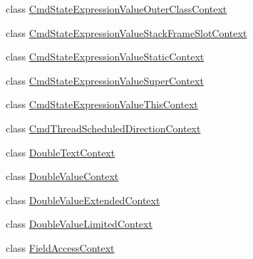 \begin{DoxyCompactItemize}
\item 
class \hyperlink{classgov_1_1nasa_1_1jpf_1_1inspector_1_1server_1_1expression_1_1parser_1_1_expression_grammar_paa97aac802c11881ff9166c765f4fc61a}{Cmd\+State\+Expression\+Value\+Outer\+Class\+Context}
\item 
class \hyperlink{classgov_1_1nasa_1_1jpf_1_1inspector_1_1server_1_1expression_1_1parser_1_1_expression_grammar_pa53e28d24e840d016fb7c58b2b73008ab}{Cmd\+State\+Expression\+Value\+Stack\+Frame\+Slot\+Context}
\item 
class \hyperlink{classgov_1_1nasa_1_1jpf_1_1inspector_1_1server_1_1expression_1_1parser_1_1_expression_grammar_pa08e6165e66cacb4d3382a343315ee767}{Cmd\+State\+Expression\+Value\+Static\+Context}
\item 
class \hyperlink{classgov_1_1nasa_1_1jpf_1_1inspector_1_1server_1_1expression_1_1parser_1_1_expression_grammar_pa66c003646cac4c60d53e10c6587465ef}{Cmd\+State\+Expression\+Value\+Super\+Context}
\item 
class \hyperlink{classgov_1_1nasa_1_1jpf_1_1inspector_1_1server_1_1expression_1_1parser_1_1_expression_grammar_pa5c670e8752735864512a29116a6ade67}{Cmd\+State\+Expression\+Value\+This\+Context}
\item 
class \hyperlink{classgov_1_1nasa_1_1jpf_1_1inspector_1_1server_1_1expression_1_1parser_1_1_expression_grammar_pa3ae49d5d83c380526042a5aff91ee0a2}{Cmd\+Thread\+Scheduled\+Direction\+Context}
\item 
class \hyperlink{classgov_1_1nasa_1_1jpf_1_1inspector_1_1server_1_1expression_1_1parser_1_1_expression_grammar_parser_1_1_double_text_context}{Double\+Text\+Context}
\item 
class \hyperlink{classgov_1_1nasa_1_1jpf_1_1inspector_1_1server_1_1expression_1_1parser_1_1_expression_grammar_parser_1_1_double_value_context}{Double\+Value\+Context}
\item 
class \hyperlink{classgov_1_1nasa_1_1jpf_1_1inspector_1_1server_1_1expression_1_1parser_1_1_expression_grammar_paf529e59fbe08e921d008fd67634bb19c}{Double\+Value\+Extended\+Context}
\item 
class \hyperlink{classgov_1_1nasa_1_1jpf_1_1inspector_1_1server_1_1expression_1_1parser_1_1_expression_grammar_pa747378014be7c4ab66961e5db1be8d25}{Double\+Value\+Limited\+Context}
\item 
class \hyperlink{classgov_1_1nasa_1_1jpf_1_1inspector_1_1server_1_1expression_1_1parser_1_1_expression_grammar_parser_1_1_field_access_context}{Field\+Access\+Context}
\item 

\end{DoxyCompactItemize}
